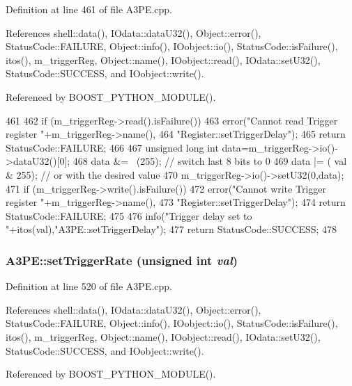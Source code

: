 Definition at line 461 of file A3PE.cpp.

References shell::data(), IOdata::dataU32(), Object::error(), StatusCode::FAILURE, Object::info(), IOobject::io(), StatusCode::isFailure(), itos(), m\_\-triggerReg, Object::name(), IOobject::read(), IOdata::setU32(), StatusCode::SUCCESS, and IOobject::write().

Referenced by BOOST\_\-PYTHON\_\-MODULE().


\begin{DoxyCode}
461                                                 {
462   if (m_triggerReg->read().isFailure()){
463     error("Cannot read Trigger register "+m_triggerReg->name(),
464         "Register::setTriggerDelay");
465     return StatusCode::FAILURE;
466   }
467   unsigned long int data=m_triggerReg->io()->dataU32()[0];
468   data &= ~(255); // switch last 8 bits to 0
469   data |= ( val & 255);   // or with the desired value
470   m_triggerReg->io()->setU32(0,data);
471   if (m_triggerReg->write().isFailure()){
472     error("Cannot write Trigger register "+m_triggerReg->name(),
473         "Register::setTriggerDelay");
474     return StatusCode::FAILURE;
475   }
476   info("Trigger delay set to "+itos(val),"A3PE::setTriggerDelay");
477   return StatusCode::SUCCESS;
478 }
\end{DoxyCode}
\hypertarget{classA3PE_a1ae8e5a69e17d6b3157779544fa14c75}{
\subsubsection[{setTriggerRate}]{ A3PE::setTriggerRate (unsigned int {\em val})}}
\label{classA3PE_a1ae8e5a69e17d6b3157779544fa14c75}


Definition at line 520 of file A3PE.cpp.

References shell::data(), IOdata::dataU32(), Object::error(), StatusCode::FAILURE, Object::info(), IOobject::io(), StatusCode::isFailure(), itos(), m\_\-triggerReg, Object::name(), IOobject::read(), IOdata::setU32(), StatusCode::SUCCESS, and IOobject::write().

Referenced by BOOST\_\-PYTHON\_\-MODULE().


